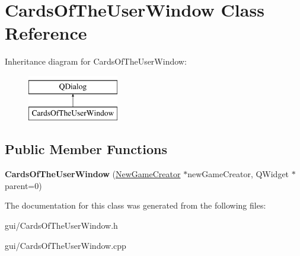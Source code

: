 \hypertarget{classCardsOfTheUserWindow}{}\section{Cards\+Of\+The\+User\+Window Class Reference}
\label{classCardsOfTheUserWindow}
Inheritance diagram for Cards\+Of\+The\+User\+Window\+:\begin{figure}[H]
\begin{center}
\leavevmode
\includegraphics[height=2.000000cm]{classCardsOfTheUserWindow}
\end{center}
\end{figure}
\subsection*{Public Member Functions}
\begin{DoxyCompactItemize}
\item 
\mbox{\label{classCardsOfTheUserWindow_a2196040b2451a78b75855244f7ab52e2}} 
{\bfseries Cards\+Of\+The\+User\+Window} (\hyperlink{classNewGameCreator}{New\+Game\+Creator} $\ast$new\+Game\+Creator, Q\+Widget $\ast$parent=0)
\end{DoxyCompactItemize}


The documentation for this class was generated from the following files\+:\begin{DoxyCompactItemize}
\item 
gui/Cards\+Of\+The\+User\+Window.\+h\item 
gui/Cards\+Of\+The\+User\+Window.\+cpp\end{DoxyCompactItemize}
